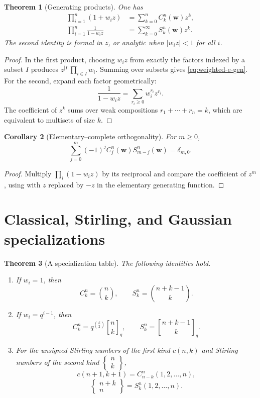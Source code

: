 \documentclass[11pt,oneside,openany]{book}
\newtheorem{theorem}{Theorem}[chapter]
\newtheorem{corollary}[theorem]{Corollary}
\theoremstyle{definition}
\theoremstyle{remark}
\newcommand{\qbinom}[2]{\genfrac{[}{]}{0pt}{}{#1}{#2}_{q}}
\newcommand{\abs}[1]{\lvert #1\rvert}
\begin{document}
\begin{theorem}[Generating products]\label{thm:weighted-generating}
One has
\begin{align}
 \prod_{i=1}^{n}(1+w_i z)
 &=\sum_{k=0}^{n}C_k^n(\mathbf w)z^k,\label{eq:weighted-e-gen}\\
 \prod_{i=1}^{n}\frac1{1-w_i z}
 &=\sum_{k=0}^{\infty}S_k^n(\mathbf w)z^k.\label{eq:weighted-h-gen}
\end{align}
The second identity is formal in $z$, or analytic when $\abs{w_i z}<1$ for all $i$.
\end{theorem}

\begin{proof}
In the first product, choosing $w_i z$ from exactly the factors indexed by a subset $I$ produces $z^{\abs I}\prod_{i\in I}w_i$.  Summing over subsets gives \eqref{eq:weighted-e-gen}.  For the second, expand each factor geometrically:
\[
 \frac1{1-w_i z}=\sum_{r_i\ge0}w_i^{r_i}z^{r_i}.
\]
The coefficient of $z^k$ sums over weak compositions $r_1+\cdots+r_n=k$, which are equivalent to multisets of size $k$.
\end{proof}

\begin{corollary}[Elementary--complete orthogonality]\label{cor:e-h-orthogonality}
For $m\ge0$,
\[
 \sum_{j=0}^{m}(-1)^jC_j^n(\mathbf w)S_{m-j}^n(\mathbf w)=\delta_{m,0}.
\]
\end{corollary}

\begin{proof}
Multiply
\(
 \prod_i(1-w_i z)
\)
by its reciprocal and compare the coefficient of $z^m$, using  with $z$ replaced by $-z$ in the elementary generating function.
\end{proof}

\section{Classical, Stirling, and Gaussian specializations}

\begin{theorem}[A specialization table]\label{thm:weighted-specializations}
The following identities hold.
\begin{enumerate}[label=\textup{(\roman*)}]
\item If $w_i=1$, then
\[
 C_k^n=\binom nk,
 \qquad
 S_k^n=\binom{n+k-1}{k}.
\]
\item If $w_i=q^{i-1}$, then
\[
 C_k^n=q^{\binom k2}\qbinom nk,
 \qquad
 S_k^n=\qbinom{n+k-1}{k}.
\]
\item For the unsigned Stirling numbers of the first kind $c(n,k)$ and Stirling numbers of the second kind $\left\{\begin{smallmatrix}n\\k\end{smallmatrix}\right\}$,
\[
 c(n+1,k+1)=C_{n-k}^{n}(1,2,\dots,n),
\]
\[
 \left\{\begin{matrix}n+k\\n\end{matrix}\right\}
 =S_k^n(1,2,\dots,n).
\]
\end{enumerate}
\end{theorem}
\end{document}
